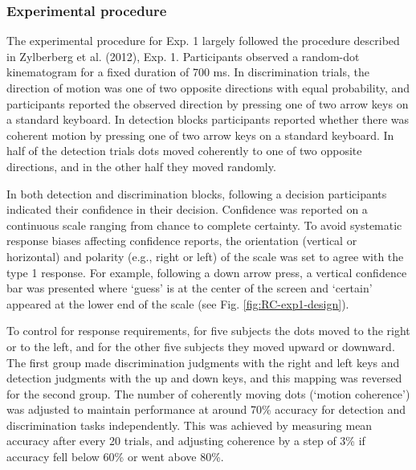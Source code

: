 \documentclass[12pt,twoside]{reedthesis}
\begin{document}
\hypertarget{experimental-procedure}{%
\subsubsection{Experimental procedure}\label{experimental-procedure}}

The experimental procedure for Exp. 1 largely followed the procedure described in Zylberberg et al. (2012), Exp. 1. Participants observed a random-dot kinematogram for a fixed duration of 700 ms. In discrimination trials, the direction of motion was one of two opposite directions with equal probability, and participants reported the observed direction by pressing one of two arrow keys on a standard keyboard. In detection blocks participants reported whether there was coherent motion by pressing one of two arrow keys on a standard keyboard. In half of the detection trials dots moved coherently to one of two opposite directions, and in the other half they moved randomly.

In both detection and discrimination blocks, following a decision participants indicated their confidence in their decision. Confidence was reported on a continuous scale ranging from chance to complete certainty. To avoid systematic response biases affecting confidence reports, the orientation (vertical or horizontal) and polarity (e.g., right or left) of the scale was set to agree with the type 1 response. For example, following a down arrow press, a vertical confidence bar was presented where `guess' is at the center of the screen and `certain' appeared at the lower end of the scale (see Fig. \ref{fig:RC-exp1-design}).

To control for response requirements, for five subjects the dots moved to the right or to the left, and for the other five subjects they moved upward or downward. The first group made discrimination judgments with the right and left keys and detection judgments with the up and down keys, and this mapping was reversed for the second group. The number of coherently moving dots (`motion coherence') was adjusted to maintain performance at around 70\% accuracy for detection and discrimination tasks independently. This was achieved by measuring mean accuracy after every 20 trials, and adjusting coherence by a step of 3\% if accuracy fell below 60\% or went above 80\%.
\end{document}
